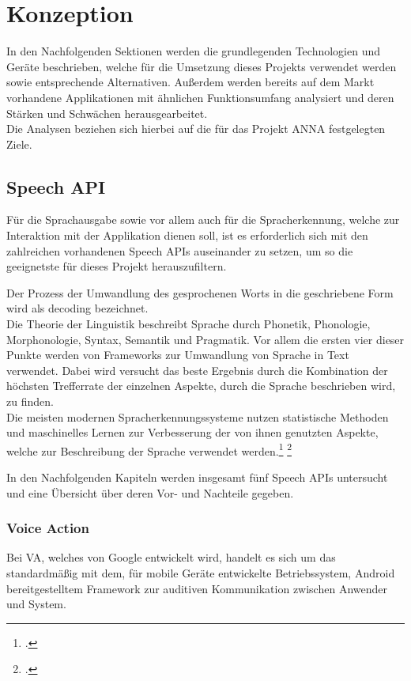 
\chapter{Konzeption}
In den Nachfolgenden Sektionen werden die grundlegenden Technologien und Geräte beschrieben, welche für die Umsetzung dieses Projekts verwendet werden sowie entsprechende Alternativen. Außerdem werden bereits auf dem Markt vorhandene Applikationen mit ähnlichen Funktionsumfang analysiert und deren Stärken und Schwächen herausgearbeitet.\\
Die Analysen beziehen sich hierbei auf die für das Projekt ANNA festgelegten Ziele.

\section{Speech API}
Für die Sprachausgabe sowie vor allem auch für die Spracherkennung, welche zur Interaktion mit der Applikation dienen soll, ist es erforderlich sich mit den zahlreichen vorhandenen Speech APIs auseinander zu setzen, um so die geeignetste für dieses Projekt herauszufiltern.

Der Prozess der Umwandlung des gesprochenen Worts in die geschriebene Form wird als decoding bezeichnet.\\
Die Theorie der Linguistik beschreibt Sprache durch Phonetik, Phonologie, Morphonologie, Syntax, Semantik und Pragmatik. Vor allem die ersten vier dieser Punkte werden von Frameworks zur Umwandlung von Sprache in Text verwendet. Dabei wird versucht das beste Ergebnis durch die Kombination der höchsten Trefferrate der einzelnen Aspekte, durch die Sprache beschrieben wird, zu finden.\\
Die meisten modernen Spracherkennungssysteme nutzen statistische Methoden und maschinelles Lernen zur Verbesserung der von ihnen genutzten Aspekte, welche zur Beschreibung der Sprache verwendet werden.\footcite[vgl.:][]{CMUSphinx} \footcite[vgl.:][S. 410 f]{automaticSpeechRecognition}

In den Nachfolgenden Kapiteln werden insgesamt fünf Speech \ac{API}s untersucht und eine Übersicht über deren Vor- und Nachteile gegeben.

\subsection{Voice Action}
Bei \ac{VA}, welches von Google entwickelt wird, handelt es sich um das standardmäßig mit dem, für mobile Geräte entwickelte Betriebssystem, Android bereitgestelltem Framework zur auditiven Kommunikation zwischen Anwender und System.

